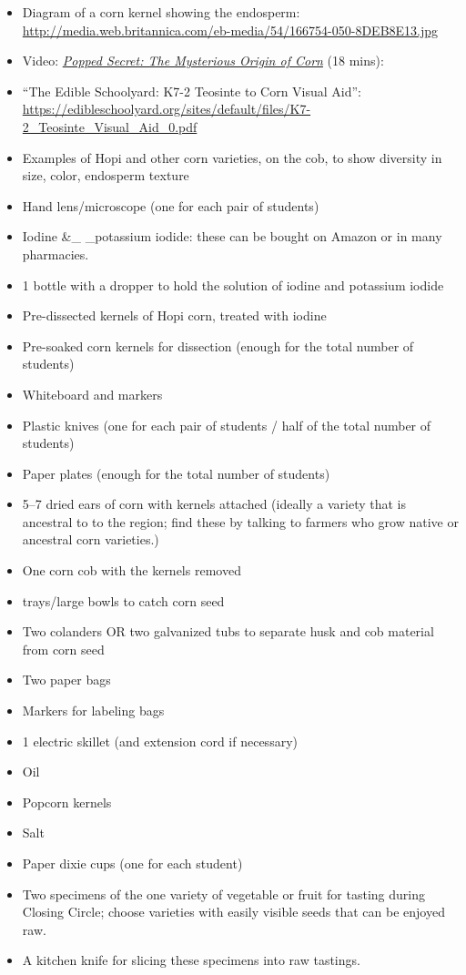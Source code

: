 \documentclass[12pt,]{article}
\providecommand{\tightlist}{%
  \setlength{\itemsep}{0pt}\setlength{\parskip}{0pt}}
\begin{document}
\begin{itemize}
\tightlist
\item
  Diagram of a corn kernel showing the endosperm: \url{http://media.web.britannica.com/eb-media/54/166754-050-8DEB8E13.jpg}
\item
  Video: \href{https://www.youtube.com/watch?v=mBuYUb_mFXA}{\emph{Popped Secret: The Mysterious Origin of Corn}} (18 mins):
\item
  ``The Edible Schoolyard: K7-2 Teosinte to Corn Visual Aid'': \url{https://edibleschoolyard.org/sites/default/files/K7-2_Teosinte_Visual_Aid_0.pdf}
\item
  Examples of Hopi and other corn varieties, on the cob, to show diversity in size, color, endosperm texture
\item
  Hand lens/microscope (one for each pair of students)
\item
  Iodine \&\_ \_potassium iodide: these can be bought on Amazon or in many pharmacies.
\item
  1 bottle with a dropper to hold the solution of iodine and potassium iodide
\item
  Pre-dissected kernels of Hopi corn, treated with iodine
\item
  Pre-soaked corn kernels for dissection (enough for the total number of students)
\item
  Whiteboard and markers
\item
  Plastic knives (one for each pair of students / half of the total number of students)
\item
  Paper plates (enough for the total number of students)
\item
  5--7 dried ears of corn with kernels attached (ideally a variety that is ancestral to to the region; find these by talking to farmers who grow native or ancestral corn varieties.)
\item
  One corn cob with the kernels removed
\item
  trays/large bowls to catch corn seed
\item
  Two colanders OR two galvanized tubs to separate husk and cob material from corn seed
\item
  Two paper bags
\item
  Markers for labeling bags
\item
  1 electric skillet (and extension cord if necessary)
\item
  Oil
\item
  Popcorn kernels
\item
  Salt
\item
  Paper dixie cups (one for each student)
\item
  Two specimens of the one variety of vegetable or fruit for tasting during Closing Circle; choose varieties with easily visible seeds that can be enjoyed raw.
\item
  A kitchen knife for slicing these specimens into raw tastings.
\end{itemize}
\end{document}
